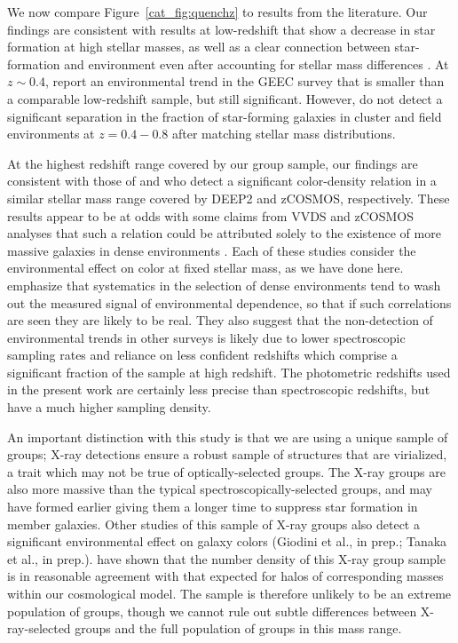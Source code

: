 We now compare Figure~\ref{cat_fig:quenchz} to results from the literature.
Our findings are consistent with results at low-redshift that show a
decrease in star formation at high stellar masses, as well as a clear
connection between star-formation and environment even after
accounting for stellar mass differences 
\citep[e.g.,][]{Kauffmann2004, Baldry2006}. At $z\sim0.4$,
\citet{McGee2011} report an environmental trend in the GEEC
survey that is smaller than a comparable low-redshift sample, but
still significant. However, \citet{Poggianti2008} do not detect a significant separation in
the fraction of star-forming galaxies in cluster and field environments at
$z=0.4-0.8$ after matching stellar mass distributions. 

At the highest redshift range covered by our group sample, our
findings are consistent with those of \citet{Cooper2010} and 
\citet{Peng2010} who detect a significant color-density relation in
a similar stellar mass range covered by DEEP2 and
zCOSMOS, respectively. These results appear to be at odds 
with some claims from VVDS and zCOSMOS analyses that such a relation
could be attributed solely to the existence of more massive galaxies
in dense environments
\citep[e.g.,][]{Scodeggio2009,Cucciati2010,Iovino2010}. Each of these
studies consider the environmental effect on color at fixed stellar
mass, as we have done here. \citet{Cooper2010}
emphasize that systematics in the selection of dense environments tend
to wash out the measured signal of environmental dependence, so that if such
correlations are seen they are likely to be real.
They also suggest that the non-detection of environmental trends in other
surveys is likely due to lower spectroscopic sampling rates and
reliance on less confident redshifts which comprise a significant
fraction of the sample at high redshift. The photometric
redshifts used in the present work are certainly less precise than
spectroscopic redshifts, but have a much higher sampling density. 

An important distinction with this study is that we are using a unique sample of groups;
X-ray detections ensure a robust sample of structures that are
virialized, a trait which may not be true of optically-selected
groups. The X-ray groups are also more massive than the typical
spectroscopically-selected groups, and may have formed earlier giving
them a longer time to suppress star formation in member
galaxies. Other studies of this sample of X-ray groups also detect a
significant environmental effect on galaxy colors (Giodini et al., in
prep.; Tanaka et al., in prep.). \citet{Finoguenov2010} have shown
that the number density of this X-ray group sample is in reasonable
agreement with that expected for halos of corresponding masses within
our cosmological model. The sample is therefore unlikely to be an extreme
population of groups, though we cannot rule out subtle differences
between X-ray-selected groups and the full population of groups in
this mass range.

